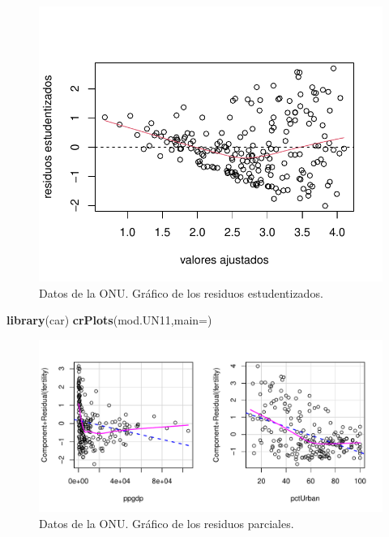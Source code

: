 \documentclass[
]{article}
\newenvironment{Shaded}{\begin{snugshade}}{\end{snugshade}}
\newcommand{\AttributeTok}[1]{\textcolor[rgb]{0.13,0.29,0.53}{#1}}
\newcommand{\FunctionTok}[1]{\textcolor[rgb]{0.13,0.29,0.53}{\textbf{#1}}}
\newcommand{\NormalTok}[1]{#1}
\newcommand{\StringTok}[1]{\textcolor[rgb]{0.31,0.60,0.02}{#1}}
\begin{document}
\begin{figure}

{\centering \includegraphics{MLG1_files/figure-latex/Un11res-1} 

}

\caption{Datos de la ONU. Gráfico de los residuos estudentizados.}\label{fig:Un11res}
\end{figure}

\begin{Shaded}
\begin{Highlighting}[]
\FunctionTok{library}\NormalTok{(car)}
\FunctionTok{crPlots}\NormalTok{(mod.UN11,}\AttributeTok{main=}\StringTok{\textquotesingle{}\textquotesingle{}}\NormalTok{)}
\end{Highlighting}
\end{Shaded}

\begin{figure}

{\centering \includegraphics{MLG1_files/figure-latex/Un11resPartial-1} 

}

\caption{Datos de la ONU. Gráfico de los residuos  parciales.}\label{fig:Un11resPartial}
\end{figure}
\end{document}
